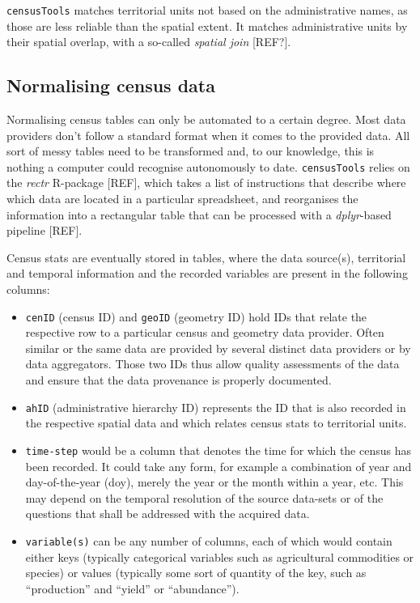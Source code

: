 \documentclass[12pt,]{article}
\providecommand{\tightlist}{%
  \setlength{\itemsep}{0pt}\setlength{\parskip}{0pt}}
\begin{document}
\texttt{censusTools} matches territorial units not based on the administrative names, as those are less reliable than the spatial extent.
It matches administrative units by their spatial overlap, with a so-called \emph{spatial join} {[}REF?{]}.

\hypertarget{normalising-census-data}{%
\subsection{Normalising census data}\label{normalising-census-data}}

Normalising census tables can only be automated to a certain degree.
Most data providers don't follow a standard format when it comes to the provided data.
All sort of messy tables need to be transformed and, to our knowledge, this is nothing a computer could recognise autonomously to date.
\texttt{censusTools} relies on the \emph{rectr} R-package {[}REF{]}, which takes a list of instructions that describe where which data are located in a particular spreadsheet, and reorganises the information into a rectangular table that can be processed with a \emph{dplyr}-based pipeline {[}REF{]}.

Census stats are eventually stored in tables, where the data source(s), territorial and temporal information and the recorded variables are present in the following columns:

\begin{itemize}
\tightlist
\item
  \texttt{cenID} (census ID) and \texttt{geoID} (geometry ID) hold IDs that relate the respective row to a particular census and geometry data provider.
  Often similar or the same data are provided by several distinct data providers or by data aggregators.
  Those two IDs thus allow quality assessments of the data and ensure that the data provenance is properly documented.
\item
  \texttt{ahID} (administrative hierarchy ID) represents the ID that is also recorded in the respective spatial data and which relates census stats to territorial units.
\item
  \texttt{time-step} would be a column that denotes the time for which the census has been recorded. It could take any form, for example a combination of year and day-of-the-year (doy), merely the year or the month within a year, etc. This may depend on the temporal resolution of the source data-sets or of the questions that shall be addressed with the acquired data.
\item
  \texttt{variable(s)} can be any number of columns, each of which would contain either keys (typically categorical variables such as agricultural commodities or species) or values (typically some sort of quantity of the key, such as ``production'' and ``yield'' or ``abundance'').
\end{itemize}
\end{document}
